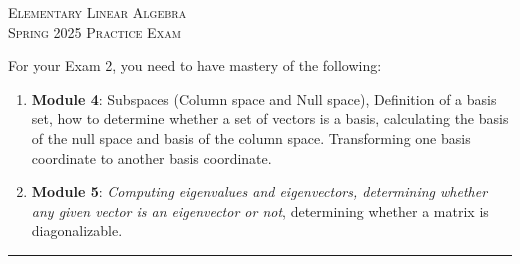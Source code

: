 \documentclass[12pt]{article}%
\begin{document}
\newcommand{\HRule}{\rule{\linewidth}{0.5mm}}

\begin{minipage}{0.8\textwidth}
\begin{flushright}
\centering
\textsc{\small Elementary Linear Algebra}\\[0.1cm] 
\textsc{\small Spring 2025 Practice Exam
}\\[0.1cm] 
\end{flushright}
\end{minipage}

\vspace{1cm}


For your Exam 2, you need to have mastery of the following:
\begin{enumerate}
    \item \textbf{Module 4}: Subspaces (Column space and Null space), Definition of a basis set, how to determine whether a set of vectors is a basis, calculating the basis of the null space and basis of the column space. Transforming one basis coordinate to another basis coordinate.
    
    \item \textbf{Module 5}: \textit{Computing eigenvalues and eigenvectors, determining whether any given vector is an eigenvector or not}, determining whether a matrix is diagonalizable.
\end{enumerate}


\HRule
\end{document}
